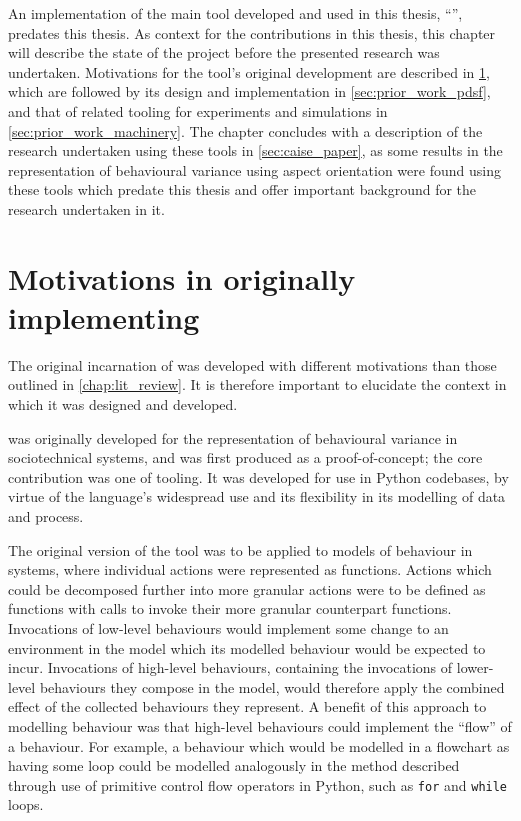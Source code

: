 
An implementation of the main tool developed and used in this thesis, ``\pdsf'',
predates this thesis. As context for the contributions in this thesis, this
chapter will describe the state of the project before the presented research was
undertaken. Motivations for the tool's original development are described in
\cref{sec:pdsf_motivations}, which are followed by its design and implementation
in \cref{sec:prior_work_pdsf}, and that of related tooling for experiments and
simulations in \cref{sec:prior_work_machinery}. The chapter concludes with a
description of the research undertaken using these tools in
\cref{sec:caise_paper}, as some results in the representation of behavioural
variance using aspect orientation were found using these tools which predate
this thesis and offer important background for the research undertaken in it.

\section{Motivations in originally implementing \pdsf}\label{sec:pdsf_motivations}

The original incarnation of \pdsf{} was developed with different motivations
than those outlined in \cref{chap:lit_review}. It is therefore important to
elucidate the context in which it was designed and developed.

\pdsf{} was originally developed for the representation of behavioural variance
in sociotechnical systems, and was first produced as a proof-of-concept; the
core contribution was one of tooling. It was developed for use in Python
codebases, by virtue of the language's widespread use and its flexibility in its
modelling of data and process.

The original version of the tool was to be applied to models of behaviour in
\sociotechnical systems, where individual actions were represented as functions.
Actions which could be decomposed further into more granular actions were to be
defined as functions with calls to invoke their more granular counterpart
functions. Invocations of low-level behaviours would implement some change to an
environment in the model which its modelled behaviour would be expected to
incur. Invocations of high-level behaviours, containing the invocations of
lower-level behaviours they compose in the model, would therefore apply the
combined effect of the collected behaviours they represent. A benefit of this
approach to modelling behaviour was that high-level behaviours could implement
the ``flow'' of a behaviour. For example, a behaviour which would be modelled in
a flowchart as having some loop could be modelled analogously in the method
described through use of primitive control flow operators in Python, such as
\lstinline{for} and \lstinline{while} loops.

